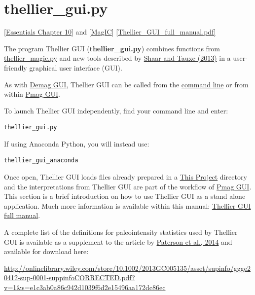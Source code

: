 \documentclass[11pt]{book}
\begin{document}
{{

\section{thellier\_gui.py}
\href{http://earthref.org/MAGIC/books/Tauxe/Essentials/WebBook3ch10.html#ch10}{[Essentials Chapter 10]} and \href{#MagIC}{[MagIC}]
\href{https://github.com/PmagPy/PmagPy-Cookbook/blob/gh-pages/thellier_GUI_full_manual.pdf}{[Thellier\_GUI\_full\_manual.pdf]}

The program Thellier GUI ({\bf thellier\_gui.py})  combines functions from \href{#thellier_magic.py}{thellier\_magic.py} and new tools described by  \href{http://dx.doi.org/10.1002/ggge.20062}{Shaar and Tauxe (2013)} \nocite{shaar13} in a user-friendly graphical user interface (GUI).

As with \href{#demag_gui.py}{Demag GUI}, Thellier GUI can  be called from  the  \href{#command_line}{command line} or from within \href{#pmag_gui.py}{Pmag GUI}.

To launch Thellier GUI independently, find your command line and enter:

\begin{verbatim}
thellier_gui.py
\end{verbatim}

If using Anaconda Python, you will instead use:

\begin{verbatim}
thellier_gui_anaconda
\end{verbatim}

Once open, Thellier GUI loads  files already prepared in a  \href{#ThisProject}{This Project} directory and the interpretations from Thellier GUI are part of the workflow of  \href{#pmag_gui.py}{Pmag GUI}.   This section is a brief introduction on how to use Thellier GUI as a stand alone application. Much more information is available within this manual: \href{https://github.com/PmagPy/PmagPy-Cookbook/blob/gh-pages/thellier_GUI_full_manual.pdf}{Thellier GUI full manual}.

\noindent  A complete list of the definitions for paleointensity statistics used by Thellier GUI is available as a supplement to the article by \href{#http://dx.doi.org/10.1002/2013GC005135}{Paterson et al., 2014}  \nocite{paterson14} and available for download here:

  \url{http://onlinelibrary.wiley.com/store/10.1002/2013GC005135/asset/supinfo/ggge20412-sup-0001-suppinfoCORRECTED.pdf?v=1&s=e1c3ab0a86c942d1039f6d2e15496aa172dc86ec}

}}
\end{document}
